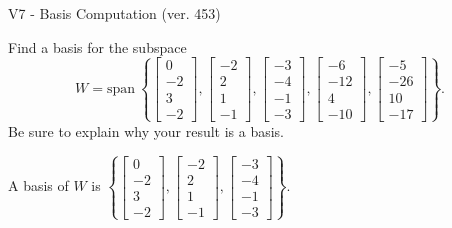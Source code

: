 \begin{exercise}
  \begin{exerciseTitle}V7 - Basis Computation (ver. 453)\end{exerciseTitle}
  \begin{exerciseStatement}
    Find a basis for the subspace 
\[W=\mathrm{span}\ \left\{\left[\begin{array}{r}
0 \\
-2 \\
3 \\
-2
\end{array}\right] , \left[\begin{array}{r}
-2 \\
2 \\
1 \\
-1
\end{array}\right] , \left[\begin{array}{r}
-3 \\
-4 \\
-1 \\
-3
\end{array}\right] , \left[\begin{array}{r}
-6 \\
-12 \\
4 \\
-10
\end{array}\right] , \left[\begin{array}{r}
-5 \\
-26 \\
10 \\
-17
\end{array}\right]\right\}.\]
 Be sure to explain why your result is a basis.


  \end{exerciseStatement}
  \begin{exerciseAnswer}
   A basis of \(W\) is  \(\left\{\left[\begin{array}{r}
0 \\
-2 \\
3 \\
-2
\end{array}\right] , \left[\begin{array}{r}
-2 \\
2 \\
1 \\
-1
\end{array}\right] , \left[\begin{array}{r}
-3 \\
-4 \\
-1 \\
-3
\end{array}\right]\right\}\).
  


  \end{exerciseAnswer}
\end{exercise}